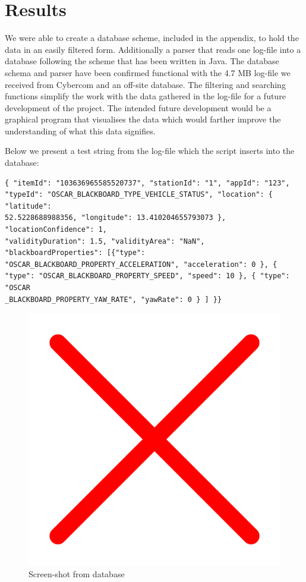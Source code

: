 \section{Results}

We were able to create a database scheme, included in the appendix, to hold the data in an easily filtered form. Additionally a parser that reads one log-file into a database following the scheme that has been written in Java. 
The database schema and parser have been confirmed functional with the 4.7 MB log-file we received from Cybercom and an off-site database. The filtering and searching functions simplify the work with the data gathered in the log-file for a future development of the project. The intended future development would be a graphical program that visualises the data which would farther improve the understanding of what this data signifies. 

Below we present a test string from the log-file which the script inserts into the database:

\begin{verbatim}
{ "itemId": "103636965585520737", "stationId": "1", "appId": "123",
"typeId": "OSCAR_BLACKBOARD_TYPE_VEHICLE_STATUS", "location": { "latitude":
52.5228688988356, "longitude": 13.410204655793073 }, "locationConfidence": 1, 
"validityDuration": 1.5, "validityArea": "NaN", "blackboardProperties": [{"type": 
"OSCAR_BLACKBOARD_PROPERTY_ACCELERATION", "acceleration": 0 }, {
"type": "OSCAR_BLACKBOARD_PROPERTY_SPEED", "speed": 10 }, { "type": "OSCAR
_BLACKBOARD_PROPERTY_YAW_RATE", "yawRate": 0 } ] }}

\end{verbatim}

\begin{figure}[H]
    \centering
    \includegraphics[scale=0.1]{images/aa.png}
    \caption{Screen-shot from database}
\end{figure}